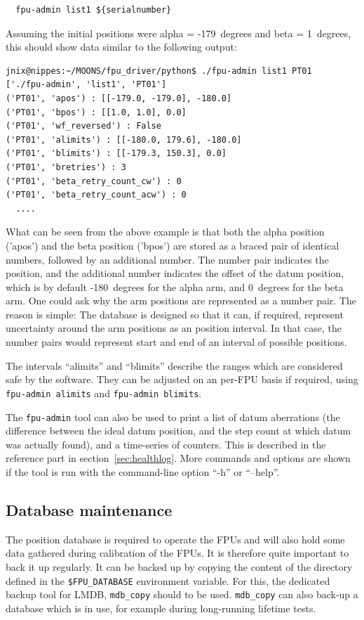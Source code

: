 \documentclass[11pt,a4paper]{report}
\begin{document}
\begin{verbatim}
  fpu-admin list1 ${serialnumber}
\end{verbatim}

Assuming the initial positions were alpha = -179\degree\ degrees and beta =
1\degree\ degrees, this should show data similar to the following output:

\begin{verbatim}
jnix@nippes:~/MOONS/fpu_driver/python$ ./fpu-admin list1 PT01
['./fpu-admin', 'list1', 'PT01']
('PT01', 'apos') : [[-179.0, -179.0], -180.0]
('PT01', 'bpos') : [[1.0, 1.0], 0.0]
('PT01', 'wf_reversed') : False
('PT01', 'alimits') : [[-180.0, 179.6], -180.0]
('PT01', 'blimits') : [[-179.3, 150.3], 0.0]
('PT01', 'bretries') : 3
('PT01', 'beta_retry_count_cw') : 0
('PT01', 'beta_retry_count_acw') : 0
  ....
\end{verbatim}

What can be seen from the above example is that both the alpha
position ('apos') and the beta position ('bpos') are stored as a
braced pair of identical numbers, followed by an additional
number. The number pair indicates the position, and the additional
number indicates the offset of the datum position, which is by default
-180\degree\ degrees for the alpha arm, and 0\degree\ degrees for the beta arm. One
could ask why the arm positions are represented as a number pair. The
reason is simple: The database is designed so that it can, if
required, represent uncertainty around the arm positions as an
position interval. In that case, the number pairs would represent
start and end of an interval of possible positions.

The intervals ``alimits'' and ``blimits'' describe the ranges which
are considered safe by the software. They can be adjusted on an
per-FPU basis if required, using \texttt{fpu-admin alimits} and
\texttt{fpu-admin blimits}.

The \texttt{fpu-admin} tool can also be used to print a list of datum
aberrations (the difference between the ideal datum position, and the
step count at which datum was actually found), and a time-series of
counters. This is described in the reference part in
section~\ref{sec:healthlog}. More commands and options are shown if the
tool is run with the command-line option ``-h'' or ``--help''.

\subsection{Database maintenance}
The position database is required to operate the FPUs and will also
hold some data gathered during calibration of the FPUs. It is
therefore quite important to back it up regularly.  It can be backed
up by copying the content of the directory defined in the
\verb+$FPU_DATABASE+ environment variable. For this, the dedicated
backup tool for LMDB, \texttt{mdb\_copy} should to be
used. \texttt{mdb\_copy} can also back-up a database which is in use,
for example during long-running lifetime tests.
\end{document}
